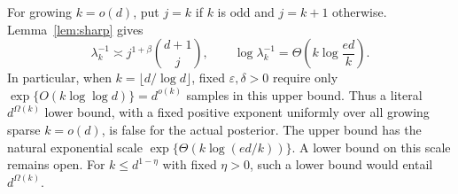 For growing $k=o(d)$, put $j=k$ if $k$ is odd and $j=k+1$ otherwise.
Lemma~\ref{lem:sharp} gives
\[
 \lambda_k^{-1}\asymp j^{1+\beta}\binom{d+1}{j},
 \qquad
 \log\lambda_k^{-1}=\Theta\!\left(k\log\frac{ed}{k}\right).
\]
In particular, when $k=\lfloor d/\log d\rfloor$, fixed
$\varepsilon,\delta>0$ require only
$\exp\{O(k\log\log d)\}=d^{o(k)}$ samples in this upper bound.
Thus a literal $d^{\Omega(k)}$ lower bound, with a fixed positive
exponent uniformly over all growing sparse $k=o(d)$, is false for the
actual posterior. The upper bound has the natural exponential scale
$\exp\{\Theta(k\log(ed/k))\}$. A lower bound on this scale remains
open. For $k\le d^{1-\eta}$ with fixed $\eta>0$, such a lower bound
would entail $d^{\Omega(k)}$.
